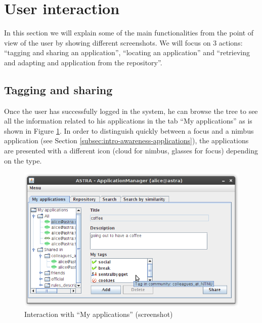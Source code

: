 
\section{User interaction}
\label{sec:user-interaction}

In this section we will explain some of the main functionalities
from the point of view of the user by showing different screenshots.
We will focus on 3 actions: ``tagging and sharing an application'', ``locating an
application'' and ``retrieving and adapting and application from the repository''.

\subsection{Tagging and sharing}
Once the user has successfully logged in the system, he can browse the tree to
see all the information related to his applications in the tab ``My
applications'' as is shown in Figure \ref{img:ui-my-applications}. In order to
distinguish quickly between a focus and a nimbus application (see Section
\ref{subsec:intro-awareness-applications}), the applications are presented with a
different icon (cloud for nimbus, glasses for focus) depending on the type.

\begin{figure}[h!]
 \begin{center}
 \includegraphics[scale=0.6]{screenshots/ui-my-applications.png}
  \caption{\label{img:ui-my-applications}Interaction with ``My applications''
  (screenshot)}
 \end{center}
\end{figure}

